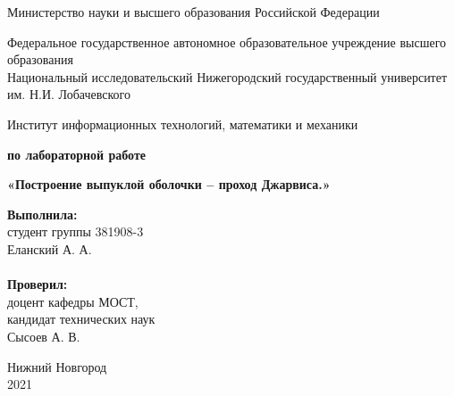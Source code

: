 \documentclass{report}
\begin{document}
\begin{titlepage}

\begin{center}
Министерство науки и высшего образования Российской Федерации
\end{center}

\begin{center}
Федеральное государственное автономное образовательное учреждение высшего образования \\
Национальный исследовательский Нижегородский государственный университет им. Н.И. Лобачевского
\end{center}

\begin{center}
Институт информационных технологий, математики и механики
\end{center}

\vspace{4em}

\begin{center}
\textbf{ по лабораторной работе} \\
\end{center}
\begin{center}
\textbf{\Large«Построение выпуклой оболочки – проход Джарвиса.»} \\
\end{center}

\vspace{4em}

\newbox{\lbox}
\newlength{\maxl}
\setlength{\maxl}{\wd\lbox}
\hfill\parbox{7cm}{
\hspace*{5cm}\hspace*{-5cm}\textbf{Выполнила:} \\ студент группы 381908-3 \\ Еланский А. А.\\
\\
\hspace*{5cm}\hspace*{-5cm}\textbf{Проверил:}\\ доцент кафедры МОСТ, \\ кандидат технических наук \\ Сысоев А. В.\\
}
\vspace{\fill}

\begin{center} Нижний Новгород \\ 2021 \end{center}

\end{titlepage}
\end{document}
